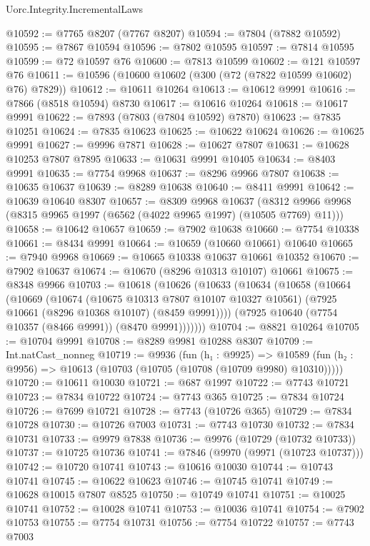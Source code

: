 \begin{lexlean}{Uorc.Integrity.IncrementalLaws}
\begin{coremodule}
@10592 := @7765 @8207 (@7767 @8207)
@10594 := @7804 (@7882 @10592)
@10595 := @7867 @10594
@10596 := @7802 @10595
@10597 := @7814 @10595
@10599 := @72 @10597 @76
@10600 := @7813 @10599
@10602 := @121 @10597 @76
@10611 := @10596 (@10600 @10602 (@300 (@72 (@7822 @10599 @10602) @76) @7829))
@10612 := @10611 @10264
@10613 := @10612 @9991
@10616 := @7866 (@8518 @10594) @8730
@10617 := @10616 @10264
@10618 := @10617 @9991
@10622 := @7893 (@7803 (@7804 @10592) @7870)
@10623 := @7835 @10251
@10624 := @7835 @10623
@10625 := @10622 @10624
@10626 := @10625 @9991
@10627 := @9996 @7871
@10628 := @10627 @7807
@10631 := @10628 @10253 @7807 @7895
@10633 := @10631 @9991 @10405
@10634 := @8403 @9991
@10635 := @7754 @9968
@10637 := @8296 @9966 @7807
@10638 := @10635 @10637
@10639 := @8289 @10638
@10640 := @8411 @9991
@10642 := @10639 @10640 @8307
@10657 := @8309
    @9968
    @10637
    (@8312 @9966 @9968 (@8315 @9965 @1997 (@6562 (@4022 @9965 @1997) (@10505 @7769) @11)))
@10658 := @10642 @10657
@10659 := @7902 @10638
@10660 := @7754 @10338
@10661 := @8434 @9991
@10664 := @10659 (@10660 @10661) @10640
@10665 := @7940 @9968
@10669 := @10665 @10338 @10637 @10661 @10352
@10670 := @7902 @10637
@10674 := @10670 (@8296 @10313 @10107) @10661
@10675 := @8348 @9966
@10703 := @10618
    (@10626
      (@10633
        (@10634
          (@10658
            (@10664
              (@10669
                (@10674
                  (@10675 @10313 @7807 @10107 @10327 @10561)
                  (@7925 @10661 (@8296 @10368 @10107) (@8459 @9991))))
              (@7925 @10640 (@7754 @10357 (@8466 @9991)) (@8470 @9991)))))))
@10704 := @8821 @10264
@10705 := @10704 @9991
@10708 := @8289 @9981 @10288 @8307
@10709 := Int.natCast_nonneg
@10719 := @9936
    (fun (h₁ : @9925) =>
    @10589 (fun (h₂ : @9956) => @10613 (@10703 (@10705 (@10708 (@10709 @9980) @10310)))))
@10720 := @10611 @10030
@10721 := @687 @1997
@10722 := @7743 @10721
@10723 := @7834 @10722
@10724 := @7743 @365
@10725 := @7834 @10724
@10726 := @7699 @10721
@10728 := @7743 (@10726 @365)
@10729 := @7834 @10728
@10730 := @10726 @7003
@10731 := @7743 @10730
@10732 := @7834 @10731
@10733 := @9979 @7838
@10736 := @9976 (@10729 (@10732 @10733))
@10737 := @10725 @10736
@10741 := @7846 (@9970 (@9971 (@10723 @10737)))
@10742 := @10720 @10741
@10743 := @10616 @10030
@10744 := @10743 @10741
@10745 := @10622 @10623
@10746 := @10745 @10741
@10749 := @10628 @10015 @7807 @8525
@10750 := @10749 @10741
@10751 := @10025 @10741
@10752 := @10028 @10741
@10753 := @10036 @10741
@10754 := @7902 @10753
@10755 := @7754 @10731
@10756 := @7754 @10722
@10757 := @7743 @7003

\end{coremodule}
\end{lexlean}
